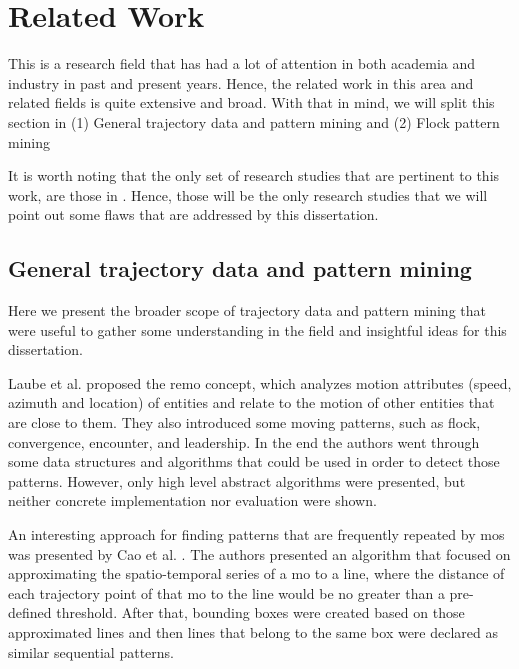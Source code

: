 \chapter{Related Work}
\label{chp:relatedwork}
This is a research field that has had a lot of attention in both academia and industry in past and present years. Hence,
the related work in this area and related fields is quite extensive and broad. With that in mind, we will split this
section in (1) General trajectory data and pattern mining and (2) Flock pattern mining

It is worth noting that the only set of research studies that are pertinent to this work, are those in
. Hence, those will be the only research studies that we will point out some flaws that are
addressed by this dissertation.

\section{General trajectory data and pattern mining}
\label{sec:rel_general}
Here we present the broader scope of trajectory data and pattern mining that were useful to gather some understanding in
the field and insightful ideas for this dissertation.

Laube et al. \citep{remo} proposed the \ac{remo} concept, which analyzes motion attributes (speed, azimuth and location)
of entities and relate to the motion of other entities that are close to them. They also introduced some moving
patterns, such as flock, convergence, encounter, and leadership. In the end the authors went through some data
structures and algorithms that could be used in order to detect those patterns. However, only high level abstract
algorithms were presented, but neither concrete implementation nor evaluation were shown.

An interesting approach for finding patterns that are frequently repeated by \acp{mo} was presented by Cao et al.
\citep{frequentpatterns}. The authors presented an algorithm that focused on approximating the spatio-temporal series of
a \ac{mo} to a line, where the distance of each trajectory point of that \ac{mo} to the line would be no greater than a
pre-defined threshold. After that, bounding boxes were created based on those approximated lines and then lines that
belong to the same box were declared as similar sequential patterns.

